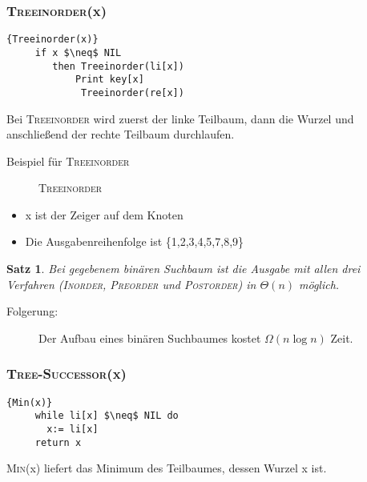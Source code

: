 \documentclass[ngerman,draft,parskip=half*,twoside]{scrreprt}
\theoremstyle{break}
\newtheorem{satz}{Satz}[chapter]
\theoremstyle{nonumberbreak}
\begin{document}
 \subsubsection{\textsc{Treeinorder}(x)}
   \begin{Algorithmus}[H]	
\begin{lstlisting}[frame=tlrb, mathescape=true, title=\textsc{Treeinorder\textnormal{(x)}}, gobble=4]{Treeinorder(x)}
     if x $\neq$ NIL
        then Treeinorder(li[x])
        	Print key[x]
             Treeinorder(re[x])
\end{lstlisting}

    Bei \textsc{Treeinorder} wird zuerst der linke Teilbaum, dann die 
    Wurzel und anschließend der rechte Teilbaum durchlaufen.
\end{Algorithmus}

  Beispiel für \textsc{Treeinorder}
  \begin{figure}[H]
  \centering  
   \caption{\textsc{Treeinorder}}
   \label{171103d}
  \end{figure}
 \begin{itemize}
  \item x ist der Zeiger auf dem Knoten
  \item Die Ausgabenreihenfolge ist \{1,2,3,4,5,7,8,9\}
 \end{itemize}
 
  \begin{satz}
 Bei gegebenem binären Suchbaum ist die Ausgabe mit allen drei Verfahren (\textsc{Inorder}, 
 \textsc{Preorder} und \textsc{Postorder}) in $\Theta( n )$ möglich.
 \end{satz}
 \begin{description}
  \item[Folgerung:] Der Aufbau eines binären Suchbaumes kostet $\Omega( n \log n )$ Zeit.
 \end{description}
 
 \subsubsection{\textsc{Tree-Successor}(x)}
 
   \begin{Algorithmus}[H]
    \begin{lstlisting}[frame=tlrb, mathescape=true, title=\textsc{Min\textnormal{(x)}}, gobble=4]{Min(x)}
     while li[x] $\neq$ NIL do
       x:= li[x]
     return x
    \end{lstlisting}

   \textsc{Min}(x) liefert das Minimum des Teilbaumes, dessen Wurzel x ist.
   \end{Algorithmus}
   
\end{document}
